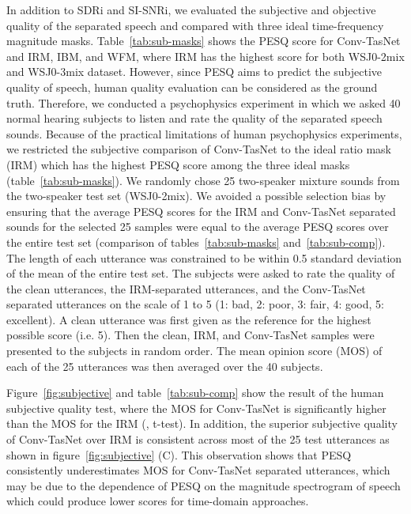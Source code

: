 \documentclass[journal]{IEEEtran}
\begin{document}
In addition to SDRi and SI-SNRi, we evaluated the subjective and objective quality of the separated speech and compared with three ideal time-frequency magnitude masks. Table~\ref{tab:sub-masks} shows the PESQ score for Conv-TasNet and IRM, IBM, and WFM, where IRM has the highest score for both WSJ0-2mix and WSJ0-3mix dataset. However, since PESQ aims to predict the subjective quality of speech, human quality evaluation can be considered as the ground truth. Therefore, we conducted a psychophysics experiment in which we asked 40 normal hearing subjects to listen and rate the quality of the separated speech sounds. Because of the practical limitations of human psychophysics experiments, we restricted the subjective comparison of Conv-TasNet to the ideal ratio mask (IRM) which has the highest PESQ score among the three ideal masks (table~\ref{tab:sub-masks}). We randomly chose 25 two-speaker mixture sounds from the two-speaker test set (WSJ0-2mix). We avoided a possible selection bias by ensuring that the average PESQ scores for the IRM and Conv-TasNet separated sounds for the selected 25 samples were equal to the average PESQ scores over the entire test set (comparison of tables~\ref{tab:sub-masks} and~\ref{tab:sub-comp}). The length of each utterance was constrained to be within 0.5 standard deviation of the mean of the entire test set. The subjects were asked to rate the quality of the clean utterances, the IRM-separated utterances, and the Conv-TasNet separated utterances on the scale of 1 to 5 (1: bad, 2: poor, 3: fair, 4: good, 5: excellent). A clean utterance was first given as the reference for the highest possible score (i.e. 5). Then the clean, IRM, and Conv-TasNet samples were presented to the subjects in random order. The mean opinion score (MOS) of each of the 25 utterances was then averaged over the 40 subjects. 

Figure~\ref{fig:subjective} and table~\ref{tab:sub-comp} show the result of the human subjective quality test, where the MOS for Conv-TasNet is significantly higher than the MOS for the IRM (, t-test). In addition, the superior subjective quality of Conv-TasNet over IRM is consistent across most of the 25 test utterances as shown in figure~\ref{fig:subjective} (C). This observation shows that PESQ consistently underestimates MOS for Conv-TasNet separated utterances, which may be due to the dependence of PESQ on the magnitude spectrogram of speech \cite{rix2001perceptual} which could produce lower scores for time-domain approaches. 
\end{document}
